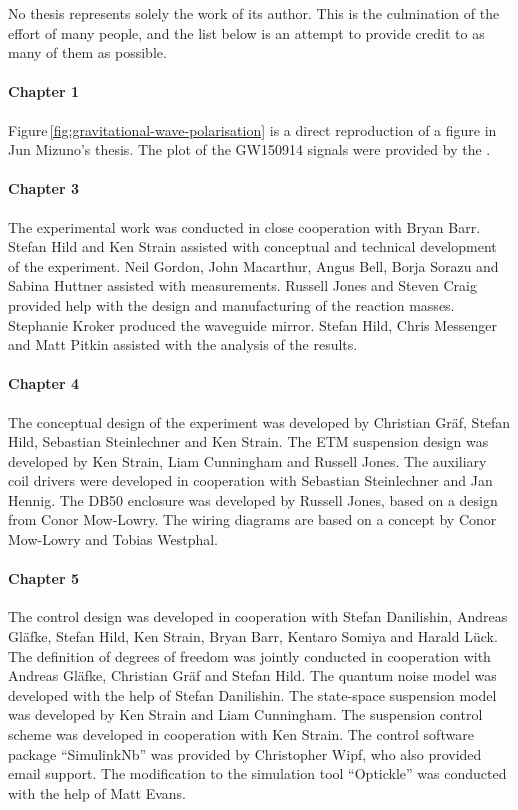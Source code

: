 No thesis represents solely the work of its author. This is the culmination of the effort of many people, and the list below is an attempt to provide credit to as many of them as possible.

\paragraph{Chapter 1}
Figure\,\ref{fig:gravitational-wave-polarisation} is a direct reproduction of a figure in Jun Mizuno's thesis. The plot of the GW150914 signals were provided by the \LSC{}.

\paragraph{Chapter 3}
The experimental work was conducted in close cooperation with Bryan Barr. Stefan Hild and Ken Strain assisted with conceptual and technical development of the experiment. Neil Gordon, John Macarthur, Angus Bell, Borja Sorazu and Sabina Huttner assisted with measurements. Russell Jones and Steven Craig provided help with the design and manufacturing of the reaction masses. Stephanie Kroker produced the waveguide mirror. Stefan Hild, Chris Messenger and Matt Pitkin assisted with the analysis of the results.

\paragraph{Chapter 4}
The conceptual design of the experiment was developed by Christian Gr\"{a}f, Stefan Hild, Sebastian Steinlechner and Ken Strain. The ETM suspension design was developed by Ken Strain, Liam Cunningham and Russell Jones. The auxiliary coil drivers were developed in cooperation with Sebastian Steinlechner and Jan Hennig. The DB50 enclosure was developed by Russell Jones, based on a design from Conor Mow-Lowry. The wiring diagrams are based on a concept by Conor Mow-Lowry and Tobias Westphal.

\paragraph{Chapter 5}
The control design was developed in cooperation with Stefan Danilishin, Andreas Gl\"{a}fke, Stefan Hild, Ken Strain, Bryan Barr, Kentaro Somiya and Harald L\"{u}ck. The definition of degrees of freedom was jointly conducted in cooperation with Andreas Gl\"{a}fke, Christian Gr\"{a}f and Stefan Hild. The quantum noise model was developed with the help of Stefan Danilishin. The state-space suspension model was developed by Ken Strain and Liam Cunningham. The suspension control scheme was developed in cooperation with Ken Strain. The control software package ``SimulinkNb'' was provided by Christopher Wipf, who also provided email support. The modification to the simulation tool ``Optickle'' was conducted with the help of Matt Evans.

